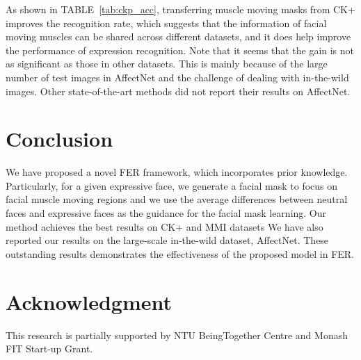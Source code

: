 \documentclass[conference,a4paper]{IEEEtran}
\begin{document}
As shown in TABLE~\ref{tab:ckp_acc}, transferring muscle moving masks from CK+ improves the recognition rate, which suggests that the information of facial moving muscles can be shared across different datasets, and it does help improve the performance of expression recognition. Note that it seems that the gain is not as significant as those in other datasets. This is mainly because of the large number of test images in AffectNet and the challenge of dealing with in-the-wild images. Other state-of-the-art methods did not report their results on AffectNet. 









\section{Conclusion}
We have proposed a novel FER framework, which incorporates prior knowledge. Particularly, for a given expressive face, we generate a facial mask to focus on facial muscle moving regions and we use the average differences between neutral faces and expressive faces as the guidance for the facial mask learning. Our method achieves the best results on CK+ and MMI datasets We have also reported our results on the large-scale in-the-wild dataset, AffectNet. These outstanding results demonstrates the effectiveness of the proposed model in FER.





\section*{Acknowledgment}
This research is partially supported by NTU BeingTogether Centre and Monash FIT Start-up Grant.













\end{document}
